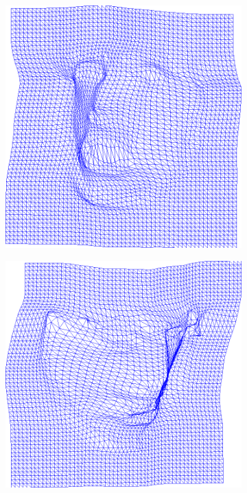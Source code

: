 \begin{figure}[h]
\begin{subfigure}[b]{0.15\textwidth}
    \end{subfigure}
    \\
    \begin{subfigure}[b]{0.15\textwidth}
            \includegraphics[width=\textwidth]{resources/Fig_Flows/6}
    \end{subfigure}
    \hfill
    \begin{subfigure}[b]{0.15\textwidth}
            \includegraphics[width=\textwidth]{resources/Fig_Flows/7}

\end{subfigure}
\end{figure}
